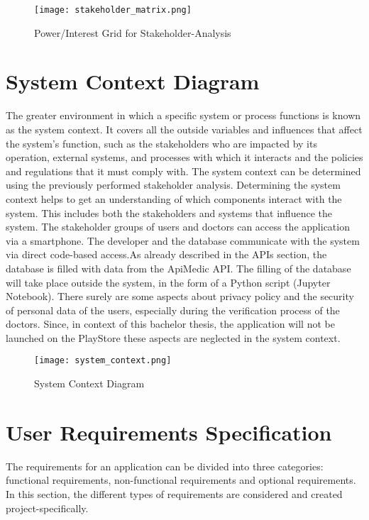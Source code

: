 \begin{figure}[h]
	\centering
	\texttt{[image: stakeholder\_matrix.png]}
	\caption[Power/Interest Grid for Stakeholder-Analysis ]{Power/Interest Grid for Stakeholder-Analysis}
\end{figure}	

\section{System Context Diagram}
The greater environment in which a specific system or process functions is known as the system context. It covers all the outside variables and influences that affect the system's function, such as the stakeholders who are impacted by its operation, external systems, and processes with which it interacts and the policies and regulations that it must comply with. The system context can be determined using the previously performed stakeholder analysis. Determining the system context helps to get an understanding of which components interact with the system. This includes both the stakeholders and systems that influence the system.
The stakeholder groups of users and doctors can access the application via a smartphone. The developer and the database communicate with the system via direct code-based access.As already described in the APIs section, the database is filled with data from the ApiMedic API. The filling of the database will take place outside the system, in the form of a Python script (Jupyter Notebook). There surely are some aspects about privacy policy and the security of personal data of the users, especially during the verification process of the doctors. Since, in context of this bachelor thesis, the application will not be launched on the PlayStore these aspects are neglected in the system context.

\begin{figure}[h!]
	\centering
	\texttt{[image: system\_context.png]}
	\caption[System Context Diagram ]{System Context Diagram}
\end{figure}

\section{User Requirements Specification}
The requirements for an application can be divided into three categories: functional requirements, non-functional requirements and optional requirements. In this section, the different types of requirements are considered and created project-specifically.


